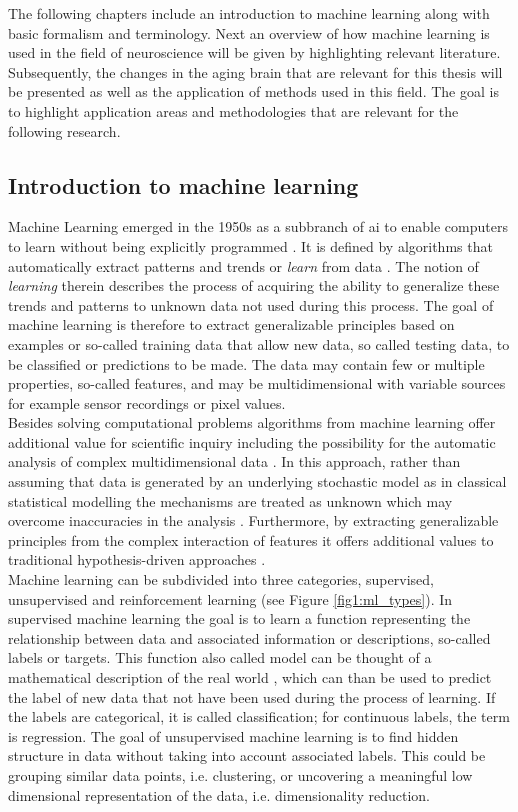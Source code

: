 The following chapters include an introduction to machine learning along with basic formalism and terminology. Next an overview of how machine learning is used in the field of neuroscience will be given by highlighting relevant literature. Subsequently, the changes in the aging brain that are relevant for this thesis will be presented as well as the application of methods used in this field. The goal is to highlight application areas and methodologies that are relevant for the following research. 

\subsection{Introduction to machine learning}
\label{subsec:ML}
Machine Learning emerged in the 1950s as a subbranch of \gls{ai} to enable computers to learn without being explicitly programmed \cite{Samual1959}. It is defined by algorithms that automatically extract patterns and trends or \textit{learn} from data \cite{Hastie2009}. The notion of \textit{learning} therein describes the process of acquiring the ability to generalize these trends and patterns to unknown data not used during this process. The goal of machine learning is therefore to extract generalizable principles based on examples or so-called training data that allow new data, so called testing data, to be classified or predictions to be made. The data may contain few or multiple properties, so-called features, and may be multidimensional with variable sources for example sensor recordings or pixel values.\\ 
Besides solving computational problems algorithms from machine learning offer additional value for scientific inquiry including the possibility for the automatic analysis of complex multidimensional data \cite{Brunton2019,Breiman2001}. In this approach, rather than assuming that data is generated by an underlying stochastic model as in classical statistical modelling the mechanisms are treated as unknown which may overcome inaccuracies in the analysis \cite{Breiman2001}. Furthermore, by extracting generalizable principles from the complex interaction of features it offers additional values to traditional hypothesis-driven approaches \cite{Vu1601,Bzdok2017}. \medskip\\
Machine learning can be subdivided into three categories, supervised, unsupervised and reinforcement learning (see Figure \ref{fig1:ml_types}). In supervised machine learning the goal is to learn a function representing the relationship between data and associated information or descriptions, so-called labels or targets. This function also called model can be thought of a mathematical description of the real world \cite{Brunton2019}, which can than be used to predict the label of new data that not have been used during the process of learning. If the labels are categorical, it is called classification; for continuous labels, the term is regression. The goal of unsupervised machine learning is to find hidden structure in data without taking into account associated labels. This could be grouping similar data points, i.e. clustering, or uncovering a meaningful low dimensional representation of the data, i.e. dimensionality reduction. 
